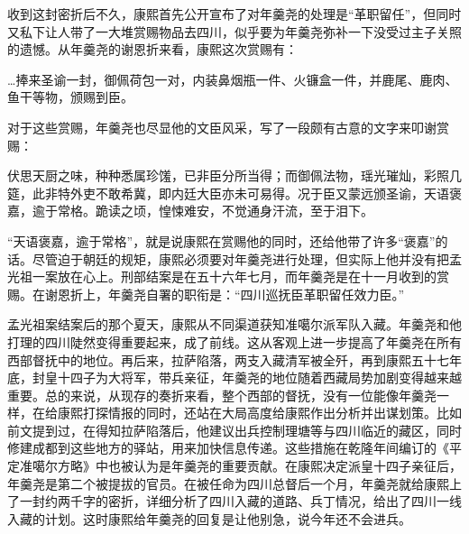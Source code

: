 
收到这封密折后不久，康熙首先公开宣布了对年羹尧的处理是“革职留任”，但同时又私下让人带了一大堆赏赐物品去四川，似乎要为年羹尧弥补一下没受过主子关照的遗憾。从年羹尧的谢恩折来看，康熙这次赏赐有：



\begin{bookquote}…捧来圣谕一封，御佩荷包一对，内装鼻烟瓶一件、火镰盒一件，并鹿尾、鹿肉、鱼干等物，颁赐到臣。\end{bookquote}


对于这些赏赐，年羹尧也尽显他的文臣风采，写了一段颇有古意的文字来叩谢赏赐：



\begin{bookquote}伏思天厨之味，种种悉属珍馐，已非臣分所当得；而御佩法物，瑶光璀灿，彩照几筵，此非特外吏不敢希冀，即内廷大臣亦未可易得。况于臣又蒙远颁圣谕，天语褒嘉，逾于常格。跪读之顷，惶悚难安，不觉通身汗流，至于泪下。\end{bookquote}


“天语褒嘉，逾于常格”，就是说康熙在赏赐他的同时，还给他带了许多“褒嘉”的话。尽管迫于朝廷的规矩，康熙必须要对年羹尧进行处理，但实际上他并没有把孟光祖一案放在心上。刑部结案是在五十六年七月，而年羹尧是在十一月收到的赏赐。在谢恩折上，年羹尧自署的职衔是：“四川巡抚臣革职留任效力臣。”



孟光祖案结案后的那个夏天，康熙从不同渠道获知准噶尔派军队入藏。年羹尧和他打理的四川陡然变得重要起来，成了前线。这从客观上进一步提高了年羹尧在所有西部督抚中的地位。再后来，拉萨陷落，两支入藏清军被全歼，再到康熙五十七年底，封皇十四子为大将军，带兵亲征，年羹尧的地位随着西藏局势加剧变得越来越重要。总的来说，从现存的奏折来看，整个西部的督抚，没有一位能像年羹尧一样，在给康熙打探情报的同时，还站在大局高度给康熙作出分析并出谋划策。比如前文提到过，在得知拉萨陷落后，他建议出兵控制理塘等与四川临近的藏区，同时修建成都到这些地方的驿站，用来加快信息传递。这些措施在乾隆年间编订的《平定准噶尔方略》中也被认为是年羹尧的重要贡献。在康熙决定派皇十四子亲征后，年羹尧是第二个被提拔的官员。在被任命为四川总督后一个月，年羹尧就给康熙上了一封约两千字的密折，详细分析了四川入藏的道路、兵丁情况，给出了四川一线入藏的计划。这时康熙给年羹尧的回复是让他别急，说今年还不会进兵。



